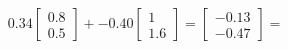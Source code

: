 \documentclass[preview]{standalone}
\begin{document}
\begin{align*}
0.34 \begin{bmatrix} 0.8 \\ 0.5 \end{bmatrix} + -0.40 \begin{bmatrix} 1 \\ 1.6 \end{bmatrix} = \begin{bmatrix} -0.13 \\ -0.47 \end{bmatrix} =
\end{align*}
\end{document}
